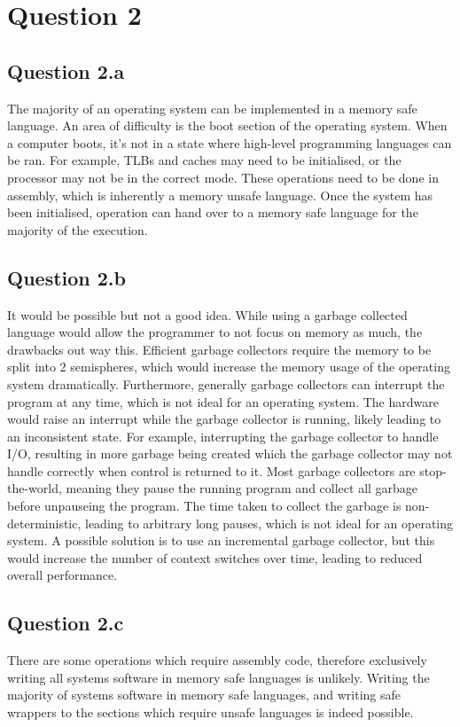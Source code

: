 \documentclass[]{article}
\begin{document}
\section{Question 2}
\subsection{Question 2.a}
The majority of an operating system can be implemented in a memory safe
language.
An area of difficulty is the boot section of the operating system.
When a computer boots, it's not in a state where high-level programming
languages can be ran.
For example, TLBs and caches may need to be initialised, or the processor may
not be in the correct mode.
These operations need to be done in assembly, which is inherently a memory
unsafe language.
Once the system has been initialised, operation can hand over to a memory safe
language for the majority of the execution.

\subsection{Question 2.b}
It would be possible but not a good idea.
While using a garbage collected language would allow the programmer to not
focus on memory as much, the drawbacks out way this.
Efficient garbage collectors require the memory to be split into 2 semispheres,
which would increase the memory usage of the operating system dramatically.
Furthermore, generally garbage collectors can interrupt the program at any time,
which is not ideal for an operating system.
The hardware would raise an interrupt while the garbage collector is running,
likely leading to an inconsistent state.
For example, interrupting the garbage collector to handle I/O, resulting in
more garbage being created which the garbage collector may not handle correctly
when control is returned to it.
Most garbage collectors are stop-the-world, meaning they pause the running
program and collect all garbage before unpauseing the program.
The time taken to collect the garbage is non-deterministic, leading to
arbitrary long pauses, which is not ideal for an operating system.
A possible solution is to use an incremental garbage collector, but this would
increase the number of context switches over time, leading to reduced overall
performance.

\subsection{Question 2.c}
There are some operations which require assembly code, therefore exclusively
writing all systems software in memory safe languages is unlikely.
Writing the majority of systems software in memory safe languages, and writing
safe wrappers to the sections which require unsafe languages is indeed
possible.
\end{document}

